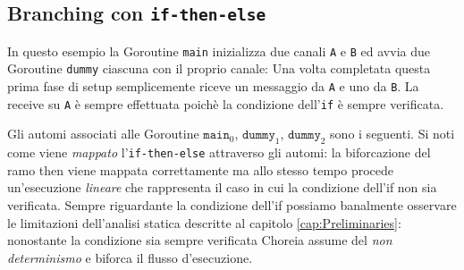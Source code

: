 \subsection{Branching con \texttt{if-then-else}}
In questo esempio la Goroutine \texttt{main} inizializza due canali \texttt{A} e \texttt{B} ed avvia due Goroutine \texttt{dummy} ciascuna con il proprio canale: Una volta completata questa prima fase di setup semplicemente riceve un messaggio da \texttt{A} e uno da \texttt{B}. La receive su \texttt{A} è sempre effettuata poichè la condizione dell'\texttt{if} è sempre verificata.

Gli automi associati alle Goroutine $\texttt{main}_0$, $\texttt{dummy}_1$, $\texttt{dummy}_2$ sono i seguenti. Si noti come viene \emph{mappato} l'\texttt{if-then-else} attraverso gli automi: la biforcazione del ramo then viene mappata correttamente ma allo stesso tempo procede un'esecuzione \emph{lineare} che rappresenta il caso in cui la condizione dell'if non sia verificata. Sempre riguardante la condizione dell'if possiamo banalmente osservare le limitazioni dell'analisi statica descritte al capitolo \ref{cap:Preliminaries}: nonostante la condizione sia sempre verificata Choreia assume del \emph{non determinismo} e biforca il flusso d'esecuzione.
\newpage %
\begin{figure}[t!]
\end{figure}
